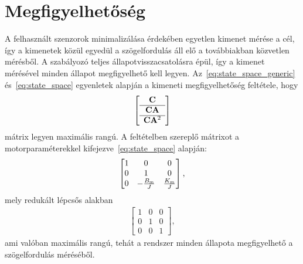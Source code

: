 \section{Megfigyelhetőség}\label{chap:observability}
A felhasznált szenzorok minimalizálása érdekében egyetlen kimenet mérése a cél, így a kimenetek közül egyedül a 
szögelfordulás áll elő a továbbiakban közvetlen mérésből. A szabályozó teljes állapotvisszacsatolásra épül, 
így a kimenet mérésével minden állapot megfigyelhető kell legyen. 
Az~\eqref{eq:state_space_generic} és~\eqref{eq:state_space} egyenletek alapján a kimeneti megfigyelhetőség feltétele, hogy
\begin{align}
    \left[\begin{array}{c}
        \mathbf{C} \\ \hline
        \mathbf{CA} \\ \hline
        \mathbf{C} \mathbf{A}^2
    \end{array}\right]
\end{align}
mátrix legyen maximális rangú. A feltételben szereplő mátrixot a motorparaméterekkel kifejezve~\eqref{eq:state_space} alapján:
\begin{align}
    \begin{bmatrix}
        1 & 0 & 0 \\
        0 & 1 & 0 \\
        0 & -\frac{B_{\mathrm{m}}}{J} & \frac{K_{\mathrm{m}}}{J}
    \end{bmatrix},
\end{align}
mely redukált lépcsős alakban
\begin{align}
    \begin{bmatrix}
        1 & 0 & 0 \\
        0 & 1 & 0 \\
        0 & 0 & 1
    \end{bmatrix},
\end{align}
ami valóban maximális rangú, tehát a rendszer minden állapota megfigyelhető a szögelfordulás méréséből.

